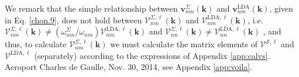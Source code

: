 We remark that the simple relationship between 
$\mathbf{v}^{\Sigma}_{nm}(\mathbf{k})$ 
and 
$\mathbf{v}^{\mathrm{LDA}}_{nm}(\mathbf{k})$,
given in 
Eq. \eqref{chon.9}, 
does not hold between
$\boldsymbol{\mathcal{V}}^{\Sigma,\ell}_{nm}(\mathbf{k})$   
and 
$\boldsymbol{\mathcal{V}}^{\mathrm{LDA},\ell}_{nm}(\mathbf{k})$,
i.e.
$\boldsymbol{\mathcal{V}}^{\Sigma,\ell}_{nm}(\mathbf{k})\ne
(\omega^\Sigma_{nm}/\omega_{nm})
\boldsymbol{\mathcal{V}}^{\mathrm{LDA},\ell}_{nm}(\mathbf{k})$ 
and
$\boldsymbol{\mathcal{V}}^{\Sigma,\ell}_{nn}(\mathbf{k})\ne
\boldsymbol{\mathcal{V}}^{\mathrm{LDA},\ell}_{nn}(\mathbf{k})$
,
and thus, to calculate
$\boldsymbol{\mathcal{V}}^{\Sigma,\ell}_{nm}(\mathbf{k})$ 
we must calculate the matrix elements of $\boldsymbol{\mathcal{V}}^{\mathcal{S},\ell}$ and
$\boldsymbol{\mathcal{V}}^{\mathrm{LDA},\ell}$ (separately)
according to the expressions of
Appendix \ref{app:calvs}. {\color{red}Aeroport Charles de Gaulle, Nov. 30,
2014, see Appendix \ref{app:voila}}.

